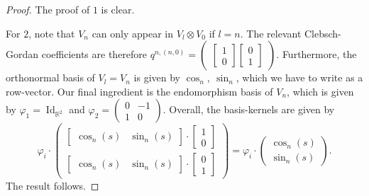 \documentclass[12pt, a4paper]{article}
\theoremstyle{plain}
\theoremstyle{definition}
\theoremstyle{remark}
\newcommand{\R}{\mathds{R}}
\DeclareMathOperator{\Id}{Id}
\begin{document}
\begin{proof}
The proof of $1$ is clear.

For $2$, note that $V_n$ can only appear in $V_l \otimes V_0$ if $l = n$. The relevant Clebsch-Gordan coefficients are therefore $q^{n,(n,0)} = \begin{pmatrix}\begin{bmatrix} 1 \\ 0\end{bmatrix} \begin{bmatrix} 0 \\ 1\end{bmatrix}\end{pmatrix}$. Furthermore, the orthonormal basis of $V_l = V_n$ is given by $\cos_n, \  \sin_n$, which we have to write as a row-vector. Our final ingredient is the endomorphism basis of $V_n$, which is given by $\varphi_1 = \Id_{\R^2}$ and $\varphi_2 = \begin{pmatrix} 0 & -1 \\ 1 & 0  \end{pmatrix}$. Overall, the basis-kernels are given by
\begin{equation*}
\varphi_i \cdot \begin{pmatrix} \begin{bmatrix} \cos_n(s) & \sin_n(s)\end{bmatrix} \cdot \begin{bmatrix} 1 \\ 0 \end{bmatrix} \\
\begin{bmatrix} \cos_n(s) & \sin_n(s)\end{bmatrix} \cdot \begin{bmatrix} 0 \\ 1 \end{bmatrix}
\end{pmatrix} = \varphi_i \cdot \begin{pmatrix} \cos_n(s) \\ \sin_n(s) \end{pmatrix}.
\end{equation*}
The result follows.


\end{proof}
\end{document}
